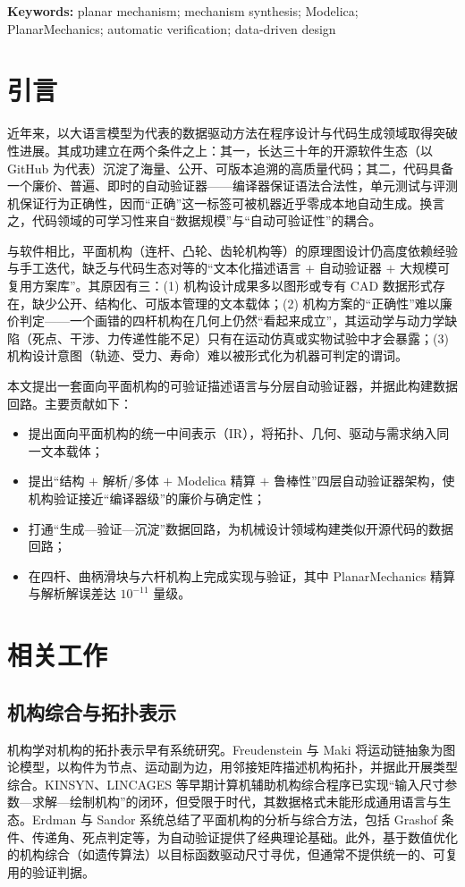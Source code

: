 \documentclass[UTF8,11pt,a4paper]{ctexart}
\begin{document}
\noindent\textbf{Keywords:} planar mechanism; mechanism synthesis; Modelica; PlanarMechanics; automatic verification; data-driven design

\section{引言}
近年来，以大语言模型为代表的数据驱动方法在程序设计与代码生成领域取得突破性进展。其成功建立在两个条件之上：其一，长达三十年的开源软件生态（以 GitHub 为代表）沉淀了海量、公开、可版本追溯的高质量代码；其二，代码具备一个廉价、普遍、即时的自动验证器——编译器保证语法合法性，单元测试与评测机保证行为正确性，因而``正确''这一标签可被机器近乎零成本地自动生成。换言之，代码领域的可学习性来自``数据规模''与``自动可验证性''的耦合。

与软件相比，平面机构（连杆、凸轮、齿轮机构等）的原理图设计仍高度依赖经验与手工迭代，缺乏与代码生态对等的``文本化描述语言 $+$ 自动验证器 $+$ 大规模可复用方案库''。其原因有三：(1) 机构设计成果多以图形或专有 CAD 数据形式存在，缺少公开、结构化、可版本管理的文本载体；(2) 机构方案的``正确性''难以廉价判定——一个画错的四杆机构在几何上仍然``看起来成立''，其运动学与动力学缺陷（死点、干涉、力传递性能不足）只有在运动仿真或实物试验中才会暴露；(3) 机构设计意图（轨迹、受力、寿命）难以被形式化为机器可判定的谓词。

本文提出一套面向平面机构的可验证描述语言与分层自动验证器，并据此构建数据回路。主要贡献如下：
\begin{itemize}[leftmargin=1.5em]
  \item 提出面向平面机构的统一中间表示（IR），将拓扑、几何、驱动与需求纳入同一文本载体；
  \item 提出``结构 $+$ 解析/多体 $+$ Modelica 精算 $+$ 鲁棒性''四层自动验证器架构，使机构验证接近``编译器级''的廉价与确定性；
  \item 打通``生成—验证—沉淀''数据回路，为机械设计领域构建类似开源代码的数据回路；
  \item 在四杆、曲柄滑块与六杆机构上完成实现与验证，其中 PlanarMechanics 精算与解析解误差达 $10^{-11}$ 量级。
\end{itemize}

\section{相关工作}
\subsection{机构综合与拓扑表示}
机构学对机构的拓扑表示早有系统研究。Freudenstein 与 Maki 将运动链抽象为图论模型，以构件为节点、运动副为边，用邻接矩阵描述机构拓扑，并据此开展类型综合。KINSYN、LINCAGES 等早期计算机辅助机构综合程序已实现``输入尺寸参数—求解—绘制机构''的闭环，但受限于时代，其数据格式未能形成通用语言与生态。Erdman 与 Sandor 系统总结了平面机构的分析与综合方法，包括 Grashof 条件、传递角、死点判定等，为自动验证提供了经典理论基础。此外，基于数值优化的机构综合（如遗传算法\cite{cabrera2002}）以目标函数驱动尺寸寻优，但通常不提供统一的、可复用的验证判据。
\end{document}
